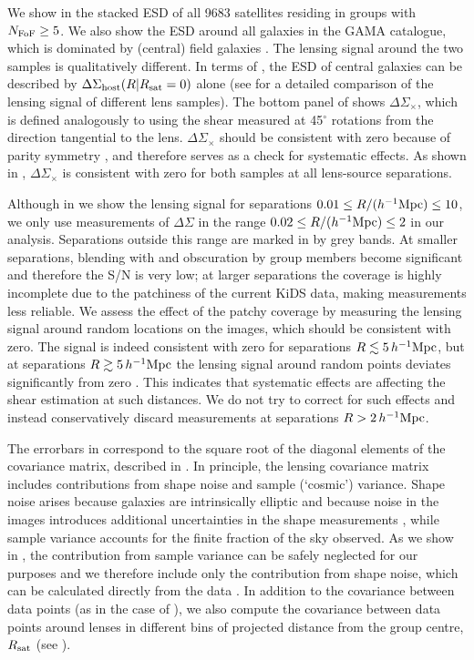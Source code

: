 We show in  the stacked ESD of all 9683 satellites residing in groups with $N_{\rm 
FoF}\geq5$. We also show the ESD around all galaxies in the GAMA catalogue, which is dominated by 
(central) field galaxies \citep{robotham11}. The lensing signal around the two samples is 
qualitatively different. In terms of , the ESD of central galaxies can be 
described by $\Delta\Sigma_{\rm host}(R \vert R_{\rm sat}=0)$ alone (see \cite{vanuitert15} for a 
detailed comparison of the lensing signal of different lens samples). The bottom panel of 
 shows $\Delta\Sigma_\times$, which is defined analogously to  using 
the shear measured at 45$^\circ$ rotations from the direction tangential to the lens. 
$\Delta\Sigma_\times$ should be consistent with zero because of parity symmetry \citep{schneider03}, 
and therefore serves as a check for systematic effects. As shown in , 
$\Delta\Sigma_\times$ is consistent with zero for both samples at all lens-source separations.

Although in  we show the lensing signal for separations $0.01 \leq R/(h^{-1}{\rm 
Mpc}) \leq 10$, we only use measurements of $\Delta\Sigma$ in the range $0.02 \leq 
R/(h^{-1}{\rm Mpc}) \leq 2$ in our analysis. Separations outside this range are marked in 
 by grey bands. At smaller separations, blending with and obscuration by group 
members become significant and therefore the S/N is very low; at larger separations the coverage is 
highly incomplete due to the patchiness of the current KiDS data, making measurements less 
reliable. We assess the effect of the patchy coverage by measuring the lensing signal around random 
locations on the images, which should be consistent with zero. The signal is indeed consistent with 
zero for separations $R\lesssim5\,h^{-1}{\rm Mpc}$, but at separations $R\gtrsim5\,h^{-1}{\rm Mpc}$ 
the lensing signal around random points deviates significantly from zero \citep[see][]{viola15}. 
This indicates that systematic effects are affecting the shear estimation at such distances. We do 
not try to correct for such effects and instead conservatively discard measurements at separations 
$R>2\,h^{-1}{\rm Mpc}$.

The errorbars in  correspond to the square root of the diagonal elements of the 
covariance matrix, described in . In principle, the lensing covariance matrix includes 
contributions from shape noise and sample (`cosmic') variance. Shape noise arises because galaxies 
are intrinsically elliptic and because noise in the images introduces additional uncertainties in 
the shape measurements \citep[see, e.g.,][]{hoekstra00}, while sample variance accounts for the 
finite fraction of the sky observed. As we show in , the contribution from sample 
variance can be safely neglected for our purposes and we therefore include only the contribution 
from shape noise, which can be calculated directly from the data \citep[see Section 3.4 
of][]{viola15}. In addition to the covariance between data points (as in the case of 
), we also compute the covariance between data points around lenses in different 
bins of projected distance from the group centre, $R_{\rm sat}$ (see ).

